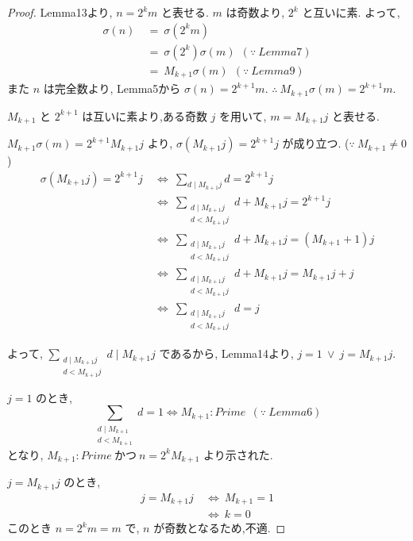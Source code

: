 \begin{proof}
Lemma13より, \(n = 2^km\) と表せる. \(m\) は奇数より, \(2^k\) と互いに素.
よって,
\begin{align*}
  \sigma(n) ~&=~ \sigma(2^km)\\
            ~&=~ \sigma(2^k)\sigma(m)~~(\because~Lemma7)\\
            ~&=~ M_{k+1}\sigma(m)~~(\because~Lemma9)
\end{align*}
また \(n\) は完全数より, Lemma5から \(\sigma(n) = 2^{k+1}m\). \(\therefore~ M_{k+1}\sigma(m) = 2^{k+1}m\).

\(M_{k+1}\) と \(2^{k+1}\) は互いに素より,ある奇数 \(j\) を用いて, \(m = M_{k+1}j\) と表せる.

\(M_{k+1} \sigma(m) = 2^{k+1} M_{k+1}j\) より, \(\sigma(M_{k+1}j) = 2^{k+1}j\) が成り立つ. (\(\because~M_{k+1} \neq 0\))
\begin{align*}
  \sigma(M_{k+1}j) = 2^{k+1}j ~&\Leftrightarrow~ \sum_{d \mid M_{k+1}j} d = 2^{k+1}j\\
                              ~&\Leftrightarrow~ \sum_{\substack{d \mid M_{k+1}j\\ d < M_{k+1}j}} d + M_{k+1}j = 2^{k+1}j\\
                              ~&\Leftrightarrow~ \sum_{\substack{d \mid M_{k+1}j\\ d < M_{k+1}j}} d + M_{k+1}j = (M_{k+1}+1)j\\
                              ~&\Leftrightarrow~ \sum_{\substack{d \mid M_{k+1}j\\ d < M_{k+1}j}} d + M_{k+1}j = M_{k+1}j + j\\
                              ~&\Leftrightarrow~ \sum_{\substack{d \mid M_{k+1}j\\ d < M_{k+1}j}} d = j
\end{align*}

よって, \(\sum_{\substack{d \mid M_{k+1}j\\ d < M_{k+1}j}} d \mid M_{k+1}j\) であるから, Lemma14より, \(j = 1 ~\vee~ j = M_{k+1}j\).

\(j = 1\) のとき,
\[
\sum_{\substack{d \mid M_{k+1}\\ d < M_{k+1}}} d = 1 \Leftrightarrow M_{k+1} : Prime~~(\because~Lemma6)
\]
となり, \(M_{k+1} : Prime ~\text{かつ} ~n = 2^kM_{k+1}\) より示された.

\(j = M_{k+1}j\) のとき,
\begin{align*}
  j = M_{k+1}j ~&\Leftrightarrow~ M_{k+1} = 1\\
               ~&\Leftrightarrow~ k = 0
\end{align*}
このとき \(n = 2^km = m\) で, \(n\) が奇数となるため,不適.
\end{proof}


